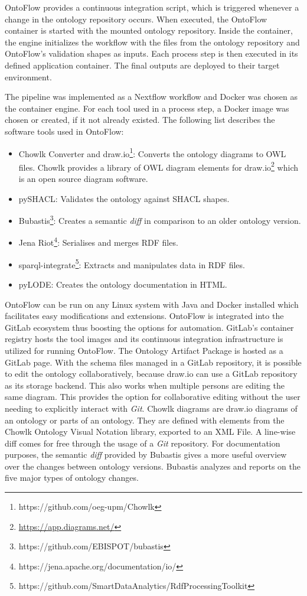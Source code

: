 \documentclass[runningheads]{llncs}
\begin{document}
OntoFlow provides a continuous integration script, which is triggered whenever a change in the ontology repository occurs. When executed, the OntoFlow container is started with the mounted ontology repository. Inside the container, the engine initializes the workflow with the files from the ontology repository and OntoFlow's validation shapes as inputs. Each process step is then executed in its defined application container. The final outputs are deployed to their target environment.

The pipeline was implemented as a Nextflow \cite{Tommaso} workflow and Docker was chosen as the container engine. For each tool used in a process step, a Docker image was chosen or created, if it not already existed. The following list describes the software tools used in OntoFlow:

\begin{itemize}
	\item Chowlk Converter and draw.io\footnote{https://github.com/oeg-upm/Chowlk}: Converts the ontology diagrams to OWL files. Chowlk\cite{ChavezFeria} provides a library of OWL diagram elements for draw.io\footnote{\url{https://app.diagrams.net/}} which is an open source diagram software.
	\item pySHACL: Validates the ontology against SHACL shapes.
	\item Bubastis\footnote{https://github.com/EBISPOT/bubastis}: Creates a semantic \textit{diff} in comparison to an older ontology version.
	\item Jena Riot\footnote{https://jena.apache.org/documentation/io/}: Serialises and merges RDF files.
	\item sparql-integrate\footnote{https://github.com/SmartDataAnalytics/RdfProcessingToolkit}: Extracts and manipulates data in RDF files.
	\item pyLODE: Creates the ontology documentation in HTML.
\end{itemize}
OntoFlow can be run on any Linux system with Java and Docker installed which facilitates easy modifications and extensions. OntoFlow is integrated into the GitLab ecosystem thus boosting the options for automation. GitLab's container registry hosts the tool images and its continuous integration infrastructure is utilized for running OntoFlow. The Ontology Artifact Package is hosted as a GitLab page. With the schema files managed in a GitLab repository, it is possible to edit the ontology collaboratively, because draw.io can use a GitLab repository as its storage backend. This also works when multiple persons are editing the same diagram. This provides the option for collaborative editing without the user needing to explicitly interact with \textit{Git}. Chowlk diagrams are draw.io diagrams of an ontology or parts of an ontology. They are defined with elements from the Chowlk Ontology Visual Notation library, exported to an XML File. A line-wise diff comes for free through the usage of a \textit{Git} repository. For documentation purposes, the semantic \textit{diff} provided by Bubastis\cite{malone} gives a more useful overview over the changes between ontology versions. Bubastis analyzes and reports on the five major types of ontology changes.
\end{document}

